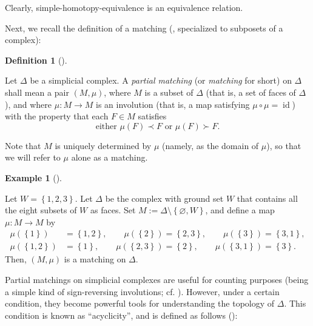 \documentclass[numbers=enddot,12pt,final,onecolumn,notitlepage]{scrartcl}%
\theoremstyle{definition}
\newtheorem{defi}[theo]{Definition}
\newenvironment{definition}[1][]
{\begin{defi}[#1]\begin{leftbar}}
{\end{leftbar}\end{defi}}
\newtheorem{exam}[theo]{Example}
\newenvironment{example}[1][]
{\begin{exam}[#1]\begin{leftbar}}
{\end{leftbar}\end{exam}}
\begin{document}
Clearly, simple-homotopy-equivalence is an equivalence relation.

Next, we recall the definition of a matching (\cite[Definition 10.6]{Kozlov20},
specialized to subposets of a complex):

\begin{definition}
\label{def.parmat} Let $\Delta$ be a simplicial complex. A \emph{partial
matching} (or \emph{matching} for short) on $\Delta$ shall mean a pair
$\left(  M,\mu\right)  $, where $M$ is a subset of $\Delta$ (that is, a set of
faces of $\Delta$), and where $\mu:M\rightarrow M$ is an involution (that is,
a map satisfying $\mu\circ\mu=\operatorname*{id}$) with the property that each
$F\in M$ satisfies%
\[
\text{either }\mu\left(  F\right)  \prec F\text{ or }\mu\left(  F\right)
\succ F.
\]


Note that $M$ is uniquely determined by $\mu$ (namely, as the domain of $\mu
$), so that we will refer to $\mu$ alone as a matching.
\end{definition}

\begin{example}
\label{exa.parmat.0} Let $W=\left\{  1,2,3\right\}  $. Let $\Delta$ be the
complex with ground set $W$ that contains all the eight subsets of $W$ as
faces. Set $M:=\Delta\setminus\left\{  \varnothing,W\right\}  $, and define a
map $\mu:M\rightarrow M$ by%
\begin{align*}
\mu\left(  \left\{  1\right\}  \right)   &  =\left\{  1,2\right\}  ,\qquad
\mu\left(  \left\{  2\right\}  \right)  =\left\{  2,3\right\}  ,\qquad
\mu\left(  \left\{  3\right\}  \right)  =\left\{  3,1\right\}  ,\\
\mu\left(  \left\{  1,2\right\}  \right)   &  =\left\{  1\right\}  ,\qquad
\mu\left(  \left\{  2,3\right\}  \right)  =\left\{  2\right\}  ,\qquad
\mu\left(  \left\{  3,1\right\}  \right)  =\left\{  3\right\}  .
\end{align*}
Then, $\left(  M,\mu\right)  $ is a matching on $\Delta$.
\end{example}

Partial matchings on simplicial complexes are useful for counting purposes
(being a simple kind of sign-reversing involutions; cf. \cite[Chapter
2]{Sagan19}). However, under a certain condition, they become powerful tools
for understanding the topology of $\Delta$. This condition is known as
\textquotedblleft acyclicity\textquotedblright, and is defined as follows
(\cite[Definition 10.7]{Kozlov20}):
\end{document}
